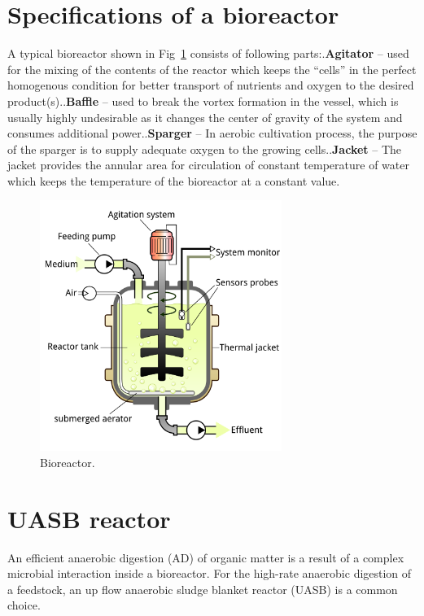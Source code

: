\section{Specifications of a bioreactor}
A typical bioreactor shown in Fig~\ref{fig:split} consists of following parts:.\textbf{Agitator} – used for the mixing of the contents of the reactor which keeps the “cells” in the perfect homogenous condition for better transport of nutrients and oxygen to the desired product(s)..\textbf{Baffle} – used to break the vortex formation in the vessel, which is usually highly undesirable as it changes the center of gravity of the system and consumes additional power..\textbf{Sparger} – In aerobic cultivation process, the purpose of the sparger is to supply adequate oxygen to the growing cells..\textbf{Jacket} – The jacket provides the annular area for circulation of constant temperature of water which keeps the temperature of the bioreactor at a constant value.\newline


\begin{figure}[htbp]
\centering
\includegraphics[width=0.7\textwidth]{images/reactor.png}
\caption{Bioreactor.}
\label{fig:split}
\end{figure}
\section{UASB reactor}
An efficient anaerobic digestion (AD) of organic matter is a result of a complex microbial interaction inside a bioreactor. For the high-rate anaerobic digestion of a feedstock, an up flow anaerobic sludge blanket reactor (UASB) is a common choice. 

